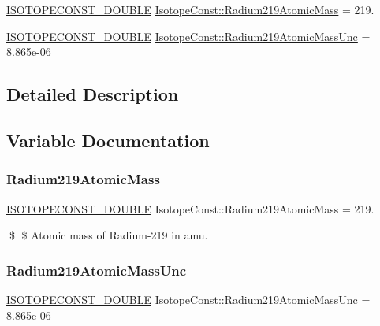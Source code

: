 \begin{DoxyCompactItemize}
\item 
\mbox{\hyperlink{group___isotope_const-_macros_ga8f45a7272ce02c0b4c65c44636ed719a}{I\+S\+O\+T\+O\+P\+E\+C\+O\+N\+S\+T\+\_\+\+D\+O\+U\+B\+LE}} \mbox{\hyperlink{group___isotope_const-_radium-_ra219_gaceaad6361d83e4cf320ebc6615220092}{Isotope\+Const\+::\+Radium219\+Atomic\+Mass}} = 219.
\item 
\mbox{\hyperlink{group___isotope_const-_macros_ga8f45a7272ce02c0b4c65c44636ed719a}{I\+S\+O\+T\+O\+P\+E\+C\+O\+N\+S\+T\+\_\+\+D\+O\+U\+B\+LE}} \mbox{\hyperlink{group___isotope_const-_radium-_ra219_gac08afdc28a7a82c2126884e648d2ea20}{Isotope\+Const\+::\+Radium219\+Atomic\+Mass\+Unc}} = 8.\+865e-\/06
\end{DoxyCompactItemize}


\subsection{Detailed Description}


\subsection{Variable Documentation}
\mbox{\label{group___isotope_const-_radium-_ra219_gaceaad6361d83e4cf320ebc6615220092}} 
\subsubsection{\texorpdfstring{Radium219\+Atomic\+Mass}{Radium219AtomicMass}}
{\footnotesize\ttfamily \mbox{\hyperlink{group___isotope_const-_macros_ga8f45a7272ce02c0b4c65c44636ed719a}{I\+S\+O\+T\+O\+P\+E\+C\+O\+N\+S\+T\+\_\+\+D\+O\+U\+B\+LE}} Isotope\+Const\+::\+Radium219\+Atomic\+Mass = 219.}

\$ \$ Atomic mass of Radium-\/219 in amu. \mbox{\label{group___isotope_const-_radium-_ra219_gac08afdc28a7a82c2126884e648d2ea20}} 
\subsubsection{\texorpdfstring{Radium219\+Atomic\+Mass\+Unc}{Radium219AtomicMassUnc}}
{\footnotesize\ttfamily \mbox{\hyperlink{group___isotope_const-_macros_ga8f45a7272ce02c0b4c65c44636ed719a}{I\+S\+O\+T\+O\+P\+E\+C\+O\+N\+S\+T\+\_\+\+D\+O\+U\+B\+LE}} Isotope\+Const\+::\+Radium219\+Atomic\+Mass\+Unc = 8.\+865e-\/06}


